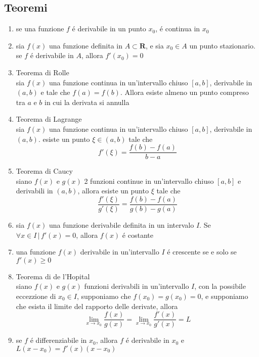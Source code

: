 \documentclass{exam}
\begin{document}
  \subsection{Teoremi}
    \begin{enumerate}
      \item
        se una funzione $f$ \'e derivabile in un punto $x_{0}$, \'e continua in $x_{0}$
      \item 
        sia $f(x)$ una funzione definita in $A\subset \mathbf{R}$, e sia $x_{0}\in A$ un punto stazionario. se $f$ \'e derivabile in $A$, allora $f'(x_{0})=0$
      \item{Teorema di Rolle}\\
        sia $f(x)$ una funzione continua in un'intervallo chiuso $[a,b]$, derivabile in $(a,b)$ e tale che $f(a)=f(b)$. Allora esiste almeno un punto compreso tra $a$ e $b$ in cui la derivata si annulla
      \item{Teorema di Lagrange}\\
        sia $f(x)$ una funzione continua in un'intervallo chiuso $[a,b]$, derivabile in $(a,b)$. esiste un punto $\xi \in (a,b)$ tale che
        \begin{equation}
          f'(\xi)=\frac{f(b)-f(a)}{b-a}
        \end{equation}
      \item{Teorema di Caucy}\\
        siano $f(x)$ e $g(x)$ 2 funzioni continue in un'intervallo chiuso $[a,b]$ e derivabili in $(a,b)$, allora esiste un punto $\xi$ tale che
        \begin{equation}
          \frac{f'(\xi)}{g'(\xi)}=\frac{f(b)-f(a)}{g(b)-g(a)}
        \end{equation}
      \item
        sia $f(x)$ una funzione derivabile definita in un intervalo $I$. Se $\forall x\in I\,|\,f'(x)=0$, allora $f(x)$ \'e costante
      \item
        una funzione $f(x)$ derivabile in un'intervallo $I$ \'e crescente se e solo se $f'(x)\ge 0$
      \item{Teorema di de l'Hopital}\\
        siano $f(x)$ e $g(x)$ funzioni derivabili in un'intervallo $I$, con la possibile eccezzione di $x_{0}\in I$, supponiamo che $f(x_{0})=g(x_{0})=0$, e supponiamo che esista il limite del rapporto delle derivate, allora
        \begin{equation}
          \lim_{x\to x_{0}}\frac{f(x)}{g(x)}=\lim_{x\to x_{0}}\frac{f'(x)}{g'(x)}=L
        \end{equation}
      \item
      	se $f$ \'e differenziabile in $x_0$, allora $f$ \'e derivabile in $x_0$ e $L(x-x_0)=f'(x)(x-x_0)$
    \end{enumerate}
  \newpage
\end{document}
